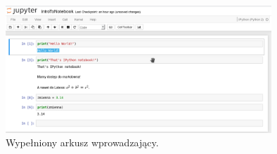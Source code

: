 \documentclass{mwart}
\begin{document}
\begin{center}
  \begin{figure}
    \includegraphics[width=10cm]{zad1}
    \caption{Wypełniony arkusz wprowadzający.}
  \end{figure}
\end{center}
\end{document}
